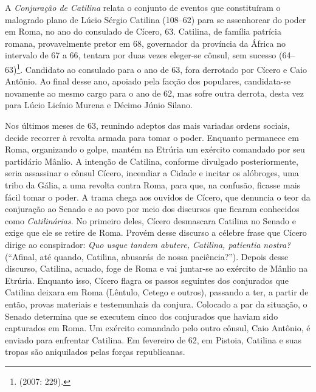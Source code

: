 





A \emph{Conjuração de Catilina} relata o conjunto de eventos que constituíram o
malogrado plano de Lúcio Sérgio Catilina (108--62) para se assenhorear do poder
em Roma, no ano do consulado de Cícero, 63. Catilina, de família patrícia
romana, provavelmente pretor  em 68, governador da província da África no
intervalo de 67 a 66, tentara por duas vezes eleger-se cônsul, sem sucesso
(64--63)\footnote{ (2007: 229).}. Candidato ao consulado para o ano de
63, fora derrotado por Cícero e Caio Antônio. Ao final desse ano, apoiado pela
facção dos populares, candidata-se novamente ao mesmo cargo para o ano de 62,
mas sofre outra derrota, desta vez para Lúcio Licínio Murena e Décimo Júnio
Silano.

Nos últimos meses de 63, reunindo adeptos das mais variadas ordens sociais,
decide recorrer à revolta armada para tomar o poder. Enquanto permanece em
Roma, organizando o golpe, mantém na Etrúria um exército comandado por seu
partidário Mânlio. A intenção de Catilina, conforme divulgado posteriormente,
seria assassinar o cônsul Cícero, incendiar a Cidade e incitar os alóbroges,
uma tribo da Gália, a uma revolta contra Roma, para que, na confusão, ficasse
mais fácil tomar o poder. A trama chega aos ouvidos de Cícero, que denuncia o
teor da conjuração ao Senado e ao povo por meio dos discursos que ficaram
conhecidos como \emph{Catilinárias}. No primeiro deles, Cícero desmascara
Catilina no Senado e exige que ele se retire de Roma. Provém desse discurso a
célebre frase que Cícero dirige ao conspirador: \emph{Quo usque tandem abutere,
Catilina, patientia nostra? }(“Afinal, até quando, Catilina, abusarás de nossa
paciência?”).  Depois desse discurso, Catilina, acuado, foge de Roma e vai
juntar-se ao exército de Mânlio na Etrúria. Enquanto isso, Cícero flagra os
passos seguintes dos conjurados que Catilina deixara em Roma (Lêntulo, Cetego e
outros), passando a ter, a partir de então, provas materiais e testemunhais da
conjura. Colocado a par da situação, o Senado determina que se executem cinco
dos conjurados que haviam sido capturados em Roma.  Um exército comandado pelo
outro cônsul, Caio Antônio, é enviado para enfrentar Catilina.  Em fevereiro de
62, em Pistoia, Catilina e suas tropas são aniquilados pelas forças
republicanas. 

